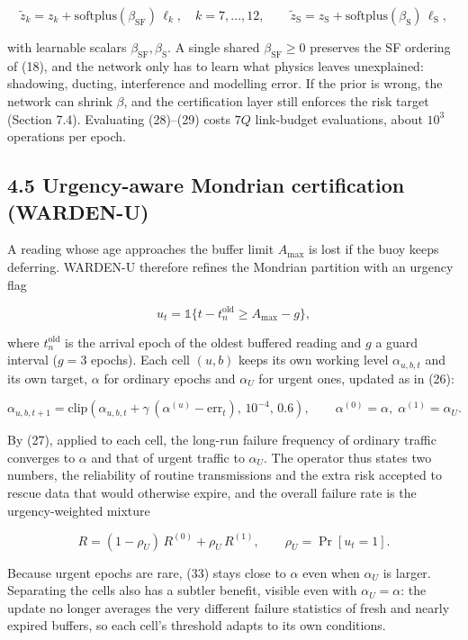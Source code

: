 \documentclass[
  11pt,
]{article}
\begin{document}
\[\tilde z_k=z_k+\mathrm{softplus}(\beta_{\mathrm{SF}})\,\ell_k,\quad k=7,\dots,12,\qquad \tilde z_{\mathrm{S}}=z_{\mathrm{S}}+\mathrm{softplus}(\beta_{\mathrm{S}})\,\ell_{\mathrm{S}}, \tag{30}\]

with learnable scalars \(\beta_{\mathrm{SF}},\beta_{\mathrm{S}}\). A
single shared \(\beta_{\mathrm{SF}}\ge0\) preserves the SF ordering of
(18), and the network only has to learn what physics leaves unexplained:
shadowing, ducting, interference and modelling error. If the prior is
wrong, the network can shrink \(\beta\), and the certification layer
still enforces the risk target (Section 7.4). Evaluating (28)--(29)
costs \(7Q\) link-budget evaluations, about \(10^3\) operations per
epoch.

\hypertarget{urgency-aware-mondrian-certification-warden-u}{%
\subsection{4.5 Urgency-aware Mondrian certification
(WARDEN-U)}\label{urgency-aware-mondrian-certification-warden-u}}

A reading whose age approaches the buffer limit \(A_{\max}\) is lost if
the buoy keeps deferring. WARDEN-U therefore refines the Mondrian
partition with an urgency flag

\[u_t=\mathbb{1}\{t-t^{\mathrm{old}}_{n}\ge A_{\max}-g\}, \tag{31}\]

where \(t^{\mathrm{old}}_n\) is the arrival epoch of the oldest buffered
reading and \(g\) a guard interval (\(g=3\) epochs). Each cell \((u,b)\)
keeps its own working level \(\alpha_{u,b,t}\) and its own target,
\(\alpha\) for ordinary epochs and \(\alpha_U\) for urgent ones, updated
as in (26):

\[\alpha_{u,b,t+1}=\mathrm{clip}\left(\alpha_{u,b,t}+\gamma\,(\alpha^{(u)}-\mathrm{err}_t),\,10^{-4},\,0.6\right),\qquad \alpha^{(0)}=\alpha,\;\alpha^{(1)}=\alpha_U. \tag{32}\]

By (27), applied to each cell, the long-run failure frequency of
ordinary traffic converges to \(\alpha\) and that of urgent traffic to
\(\alpha_U\). The operator thus states two numbers, the reliability of
routine transmissions and the extra risk accepted to rescue data that
would otherwise expire, and the overall failure rate is the
urgency-weighted mixture

\[R=(1-\rho_U)\,R^{(0)}+\rho_U\,R^{(1)},\qquad \rho_U=\Pr[u_t=1]. \tag{33}\]

Because urgent epochs are rare, (33) stays close to \(\alpha\) even when
\(\alpha_U\) is larger. Separating the cells also has a subtler benefit,
visible even with \(\alpha_U=\alpha\): the update no longer averages the
very different failure statistics of fresh and nearly expired buffers,
so each cell's threshold adapts to its own conditions.
\end{document}
